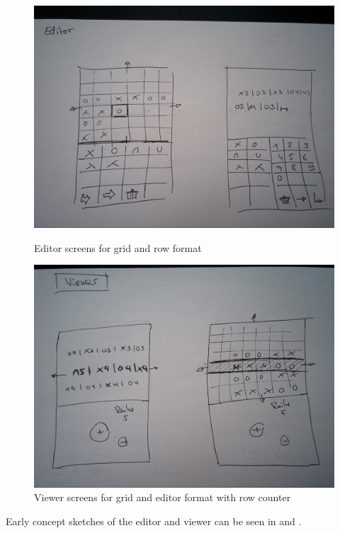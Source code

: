 \begin{figure}
\centering
\begin{minipage}{0.7\textwidth}
  \centering
  \includegraphics[width=1\linewidth]{images/image00.jpg}
  \caption[Editor screens for grid and row format \small (own image)]{Editor screens for grid and row format}
  \label{fig_wireframe3}
\end{minipage}

\begin{minipage}{0.7\textwidth}
  \centering
  \includegraphics[width=1\linewidth]{images/image02.jpg}
  \caption[Viewer screens for grid and editor format with row counter \small (own image)]{Viewer screens for grid and editor format with row counter}
  \label{fig_wireframe4}
\end{minipage}
\end{figure}

Early concept sketches of the editor and viewer can be seen in  and .